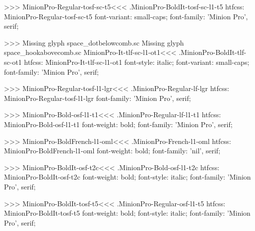 {>>>
\<MinionPro-Regular-tosf-sc-t5\><<<
.MinionPro-BoldIt-tosf-sc-l1-t5
htfcss:  MinionPro-Regular-tosf-sc-t5  font-variant: small-caps; font-family: 'Minion Pro', serif;

>>>
Missing glyph	space_dotbelowcomb.sc
Missing glyph	space_hookabovecomb.sc
\<MinionPro-It-tlf-sc-l1-ot1\><<<
.MinionPro-BoldIt-tlf-sc-ot1
htfcss:  MinionPro-It-tlf-sc-l1-ot1  font-style: italic; font-variant: small-caps; font-family: 'Minion Pro', serif;

>>>
\<MinionPro-Regular-tosf-l1-lgr\><<<
.MinionPro-Regular-lf-lgr
htfcss:  MinionPro-Regular-tosf-l1-lgr  font-family: 'Minion Pro', serif;

>>>
\<MinionPro-Bold-osf-l1-t1\><<<
.MinionPro-Regular-lf-l1-t1
htfcss:  MinionPro-Bold-osf-l1-t1  font-weight: bold; font-family: 'Minion Pro', serif;

>>>
\<MinionPro-BoldFrench-l1-oml\><<<
.MinionPro-French-l1-oml
htfcss:  MinionPro-BoldFrench-l1-oml  font-weight: bold; font-family: 'nil', serif;

>>>
\<MinionPro-BoldIt-osf-t2c\><<<
.MinionPro-Bold-osf-l1-t2c
htfcss:  MinionPro-BoldIt-osf-t2c  font-weight: bold; font-style: italic; font-family: 'Minion Pro', serif;

>>>
\<MinionPro-BoldIt-tosf-t5\><<<
.MinionPro-Regular-osf-l1-t5
htfcss:  MinionPro-BoldIt-tosf-t5  font-weight: bold; font-style: italic; font-family: 'Minion Pro', serif;

}
